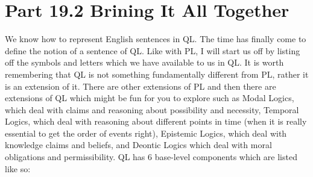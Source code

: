 



\section{Part 19.2 Brining It All Together}
We know how to represent English sentences in QL. The time has finally come to define the notion of a \gls{sentence of QL}. Like with PL, I will start us off by listing off the symbols and letters which we have available to us in QL. It is worth remembering that QL is not something fundamentally different from PL, rather it is an extension of it. There are other extensions of PL and then there are extensions of QL which might be fun for you to explore such as Modal Logics, which deal with claims and reasoning about possibility and necessity, Temporal Logics, which deal with reasoning about different points in time (when it is really essential to get the order of events right), Epistemic Logics, which deal with knowledge claims and beliefs, and Deontic Logics which deal with moral obligations and permissibility. QL has 6 base-level components which are listed like so: 

